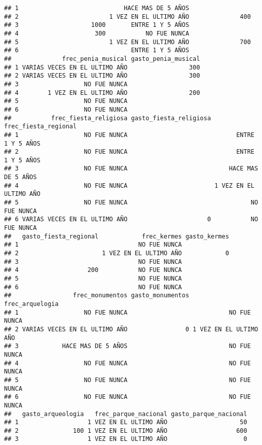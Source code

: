 \documentclass[
]{article}
\begin{document}
\begin{verbatim}
## 1                             HACE MAS DE 5 AÑOS                 
## 2                         1 VEZ EN EL ULTIMO AÑO              400
## 3                    1000       ENTRE 1 Y 5 AÑOS                 
## 4                     300           NO FUE NUNCA                 
## 5                         1 VEZ EN EL ULTIMO AÑO              700
## 6                               ENTRE 1 Y 5 AÑOS                 
##              frec_penia_musical gasto_penia_musical
## 1 VARIAS VECES EN EL ULTIMO AÑO                 300
## 2 VARIAS VECES EN EL ULTIMO AÑO                 300
## 3                  NO FUE NUNCA                    
## 4        1 VEZ EN EL ULTIMO AÑO                 200
## 5                  NO FUE NUNCA                    
## 6                  NO FUE NUNCA                    
##           frec_fiesta_religiosa gasto_fiesta_religiosa   frec_fiesta_regional
## 1                  NO FUE NUNCA                              ENTRE 1 Y 5 AÑOS
## 2                  NO FUE NUNCA                              ENTRE 1 Y 5 AÑOS
## 3                  NO FUE NUNCA                            HACE MAS DE 5 AÑOS
## 4                  NO FUE NUNCA                        1 VEZ EN EL ULTIMO AÑO
## 5                  NO FUE NUNCA                                  NO FUE NUNCA
## 6 VARIAS VECES EN EL ULTIMO AÑO                      0           NO FUE NUNCA
##   gasto_fiesta_regional            frec_kermes gasto_kermes
## 1                                 NO FUE NUNCA             
## 2                       1 VEZ EN EL ULTIMO AÑO            0
## 3                                 NO FUE NUNCA             
## 4                   200           NO FUE NUNCA             
## 5                                 NO FUE NUNCA             
## 6                                 NO FUE NUNCA             
##                 frec_monumentos gasto_monumentos        frec_arquelogia
## 1                  NO FUE NUNCA                            NO FUE NUNCA
## 2 VARIAS VECES EN EL ULTIMO AÑO                0 1 VEZ EN EL ULTIMO AÑO
## 3            HACE MAS DE 5 AÑOS                            NO FUE NUNCA
## 4                  NO FUE NUNCA                            NO FUE NUNCA
## 5                  NO FUE NUNCA                            NO FUE NUNCA
## 6                  NO FUE NUNCA                            NO FUE NUNCA
##   gasto_arqueologia   frec_parque_nacional gasto_parque_nacional
## 1                   1 VEZ EN EL ULTIMO AÑO                    50
## 2               100 1 VEZ EN EL ULTIMO AÑO                   600
## 3                   1 VEZ EN EL ULTIMO AÑO                     0

\end{verbatim}
\end{document}
